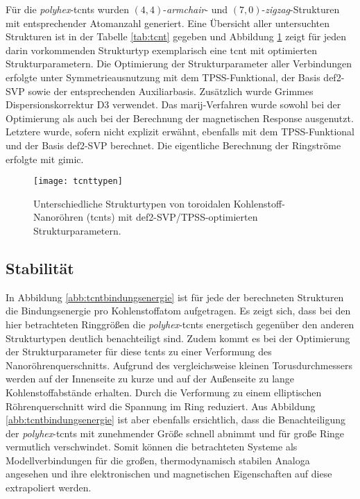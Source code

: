 Für die \textit{polyhex}-\acp{tcnt} wurden $(4,4)$-\textit{armchair}- und $(7,0)$-\textit{zigzag}-Strukturen mit entsprechender Atomanzahl generiert. Eine Übersicht aller untersuchten Strukturen ist in der Tabelle \ref{tab:tcnt} gegeben und Abbildung \ref{abb:tcnttypen} zeigt für jeden darin vorkommenden Strukturtyp exemplarisch eine \ac{tcnt} mit optimierten Strukturparametern. Die Optimierung der Strukturparameter aller Verbindungen erfolgte unter Symmetrieausnutzung mit dem TPSS-Funktional\supercite{tao2003climbing}, der Basis def2-SVP\supercite{weigend2005balanced} sowie der entsprechenden Auxiliarbasis\supercite{weigend2006accurate}. Zusätzlich wurde Grimmes Dispersionskorrektur D3\supercite{grimme2010consistent,grimme2011effect} verwendet. Das \ac{marij}-Verfahren wurde sowohl bei der Optimierung\supercite{sierka2003fast} als auch bei der Berechnung der magnetischen Response\supercite{reiter2017calculation} ausgenutzt. Letztere wurde, sofern nicht explizit erwähnt, ebenfalls mit dem TPSS-Funktional und der Basis def2-SVP berechnet. Die eigentliche Berechnung der Ringströme erfolgte mit \ac{gimic}\supercite{juselius2004calculation,taubert2011calculation,fliegl2011gauge,sundholm2016calculations}.
\begin{figure}[ht!]
	\centering
	\texttt{[image: tcnttypen]}
	\captionsetup{figurewithin = chapter}
	\captionsetup{font=small, labelfont=bf}\caption[Strukturtypen von toroidalen Kohlenstoff-Nanoröhren]{Unterschiedliche Strukturtypen von toroidalen Kohlenstoff-Nanoröhren (\acp{tcnt}) mit def2-SVP/TPSS-optimierten Strukturparametern.}
\label{abb:tcnttypen}
\end{figure}

\subsection{Stabilität}
In Abbildung \ref{abb:tcntbindungsenergie} ist für jede der berechneten Strukturen die Bindungsenergie pro Kohlenstoffatom aufgetragen. Es zeigt sich, dass bei den hier betrachteten Ringgrößen die \textit{polyhex}-\acp{tcnt} energetisch gegenüber den anderen Strukturtypen deutlich benachteiligt sind. Zudem kommt es bei der Optimierung der Strukturparameter für diese \acp{tcnt} zu einer Verformung des Nanoröhrenquerschnitts. Aufgrund des vergleichsweise kleinen Torusdurchmessers werden auf der Innenseite zu kurze und auf der Außenseite zu lange Kohlenstoffabstände erhalten. Durch die Verformung zu einem elliptischen Röhrenquerschnitt wird die Spannung im Ring reduziert. Aus Abbildung \ref{abb:tcntbindungsenergie} ist aber ebenfalls ersichtlich, dass die Benachteiligung der \textit{polyhex}-\acp{tcnt} mit zunehmender Größe schnell abnimmt und für große Ringe vermutlich verschwindet. Somit können die betrachteten Systeme als Modellverbindungen für die großen, thermodynamisch stabilen Analoga angesehen und ihre elektronischen und magnetischen Eigenschaften auf diese extrapoliert werden.

